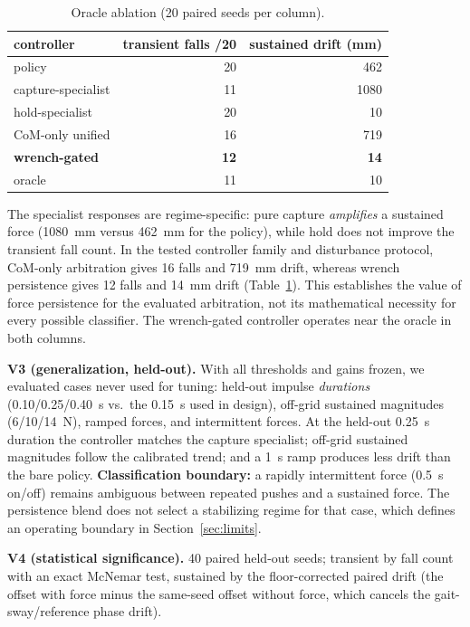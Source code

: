 \documentclass[journal]{IEEEtran}
\begin{document}
\begin{table}[t]
\caption{Oracle ablation (20 paired seeds per column).}
\label{tab:ablation}
\centering
\begin{tabular}{lrr}
\hline
controller & transient falls /20 & sustained drift (mm)\\
\hline
policy & 20 & 462\\
capture-specialist & 11 & 1080\\
hold-specialist & 20 & 10\\
CoM-only unified & 16 & 719\\
\textbf{wrench-gated} & \textbf{12} & \textbf{14}\\
oracle & 11 & 10\\
\hline
\end{tabular}
\end{table}

The specialist responses are regime-specific: pure capture \emph{amplifies} a sustained force (1080~mm versus 462~mm for the policy), while hold does not improve the transient fall count. In the tested controller family and disturbance protocol, CoM-only arbitration gives 16 falls and 719~mm drift, whereas wrench persistence gives 12 falls and 14~mm drift (Table~\ref{tab:ablation}). This establishes the value of force persistence for the evaluated arbitration, not its mathematical necessity for every possible classifier. The wrench-gated controller operates near the oracle in both columns.

\textbf{V3 (generalization, held-out).} With all thresholds and gains frozen, we evaluated cases never used for tuning: held-out impulse \emph{durations} (0.10/0.25/0.40~s vs.\ the 0.15~s used in design), off-grid sustained magnitudes (6/10/14~N), ramped forces, and intermittent forces. At the held-out 0.25~s duration the controller matches the capture specialist; off-grid sustained magnitudes follow the calibrated trend; and a 1~s ramp produces less drift than the bare policy. \textbf{Classification boundary:} a rapidly intermittent force (0.5~s on/off) remains ambiguous between repeated pushes and a sustained force. The persistence blend does not select a stabilizing regime for that case, which defines an operating boundary in Section~\ref{sec:limits}.

\textbf{V4 (statistical significance).} 40 paired held-out seeds; transient by fall count with an exact McNemar test, sustained by the floor-corrected paired drift (the offset with force minus the same-seed offset without force, which cancels the gait-sway/reference phase drift).
\end{document}
